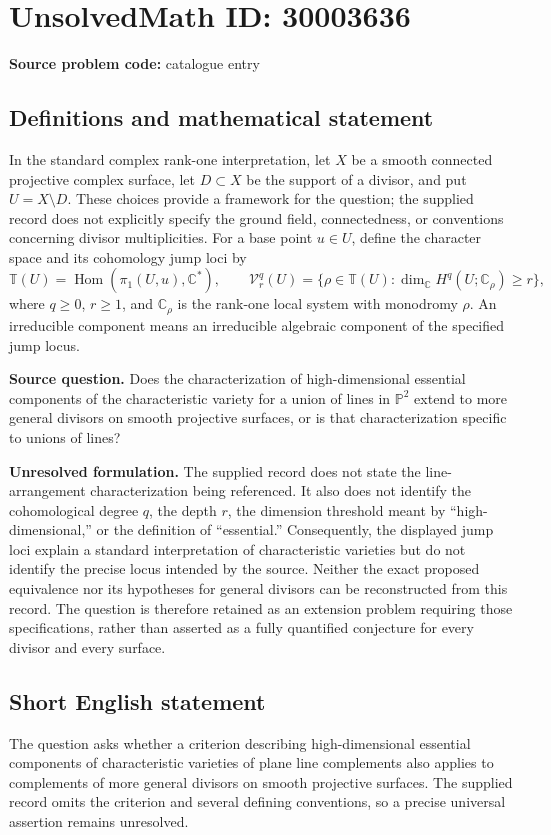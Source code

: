 \documentclass[11pt]{article}
\newcommand{\C}{\mathbb{C}}
\begin{document}
\section*{UnsolvedMath ID: 30003636}
\textbf{Source problem code:} catalogue entry
\subsection{Definitions and mathematical statement}
In the standard complex rank-one interpretation, let \(X\) be a smooth connected projective complex surface, let \(D\subset X\) be the support of a divisor, and put \(U=X\setminus D\). These choices provide a framework for the question; the supplied record does not explicitly specify the ground field, connectedness, or conventions concerning divisor multiplicities. For a base point \(u\in U\), define the character space and its cohomology jump loci by
\[
\mathbb T(U)=\operatorname{Hom}(\pi_1(U,u),\C^*),\qquad
\mathcal V^q_r(U)=\{\rho\in\mathbb T(U):\dim_{\C}H^q(U;\C_\rho)\ge r\},
\]
where \(q\ge0\), \(r\ge1\), and \(\C_\rho\) is the rank-one local system with monodromy \(\rho\). An irreducible component means an irreducible algebraic component of the specified jump locus.

\textbf{Source question.} Does the characterization of high-dimensional essential components of the characteristic variety for a union of lines in \(\mathbb P^2\) extend to more general divisors on smooth projective surfaces, or is that characterization specific to unions of lines?

\textbf{Unresolved formulation.} The supplied record does not state the line-arrangement characterization being referenced. It also does not identify the cohomological degree \(q\), the depth \(r\), the dimension threshold meant by ``high-dimensional,'' or the definition of ``essential.'' Consequently, the displayed jump loci explain a standard interpretation of characteristic varieties but do not identify the precise locus intended by the source. Neither the exact proposed equivalence nor its hypotheses for general divisors can be reconstructed from this record. The question is therefore retained as an extension problem requiring those specifications, rather than asserted as a fully quantified conjecture for every divisor and every surface.
\subsection{Short English statement}
The question asks whether a criterion describing high-dimensional essential components of characteristic varieties of plane line complements also applies to complements of more general divisors on smooth projective surfaces. The supplied record omits the criterion and several defining conventions, so a precise universal assertion remains unresolved.
\end{document}
